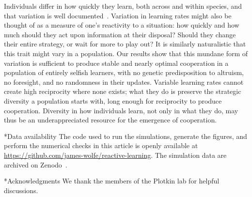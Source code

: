 \documentclass[10pt]{article}
\makeatletter
\renewcommand\section{\@startsection{section}{1}{\z@}{-3ex \@plus -1ex \@minus -.2ex}{1.2ex \@plus .2ex}{\sffamily\bfseries\Large}}
\makeatother
\begin{document}
Individuals differ in how quickly they learn, both across and within species, and that variation is well documented~\cite{thornton2012-IndividualVariationCognitive,sih2012-LinkingBehaviouralSyndromes,frank2007-GeneticTripleDissociation}. Variation in learning rates might also be thought of as a measure of one's reactivity to a situation: how quickly and how much should they act upon information at their disposal? Should they change their entire strategy, or wait for more to play out? It is similarly naturalistic that this trait might vary in a population. Our results show that this mundane form of variation is sufficient to produce stable and nearly optimal cooperation in a population of entirely selfish learners, with no genetic predisposition to altruism, no foresight, and no randomness in their updates. Variable learning rates cannot create high reciprocity where none exists; what they do is preserve the strategic diversity a population starts with, long enough for reciprocity to produce cooperation. Diversity in how individuals learn, not only in what they do, may thus be an underappreciated resource for the emergence of cooperation.

\section*{Data availability}
The code used to run the simulations, generate the figures, and perform the numerical checks in this article is openly available at \href{https://github.com/james-wolfe/reactive-learning}{https://github.com/james-wolfe/reactive-learning}.
The simulation data are archived on Zenodo~\cite{wolfe2026-Data}.

\section*{Acknowledgments}
We thank the members of the Plotkin lab for helpful discussions.
\end{document}
